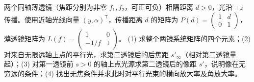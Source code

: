 两个同轴薄透镜（焦距分别为非零 \(f_1,f_2\)，可正可负）相隔距离 \(d>0\)，光沿 \(+z\) 传播。使用近轴光线向量 \((y,\alpha)^\mathsf T\)，传播距离 \(d\) 的矩阵为 \(P(d)=\begin{pmatrix}1&d\\0&1\end{pmatrix}\)，薄透镜矩阵为 \(L(f)=\begin{pmatrix}1&0\\-1/f&1\end{pmatrix}\)。
(1) 求整个两镜系统矩阵的四个元素；(2) 对来自无限远轴上点的平行光，求第二透镜后的后焦距 \(s'_{\infty}\)（相对第二透镜量起）；(3) 对第一透镜前 \(s>0\) 的轴上点光源求第二透镜后的像距 \(s'\)，说明像在无穷远的条件；(4) 找出无焦条件并求此时对平行光束的横向放大率及角放大率。
